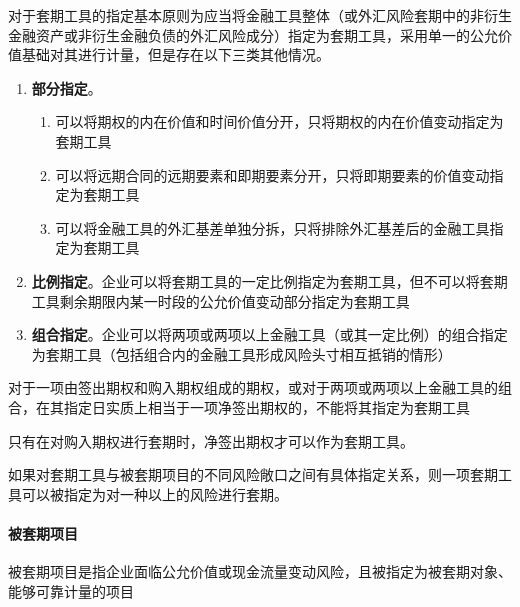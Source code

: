 \documentclass[UTF8,12pt]{ctexart}
\numberwithin{equation}{section} %
\numberwithin{figure}{section}
\numberwithin{table}{section}
\begin{document}
	对于套期工具的指定基本原则为应当将金融工具整体（或外汇风险套期中的非衍生金融资产或非衍生金融负债的外汇风险成分）指定为套期工具，采用单一的公允价值基础对其进行计量，但是存在以下三类其他情况。
	\begin{enumerate}
		\item \textbf{部分指定}。
		\begin{enumerate}
			\item 可以将期权的内在价值和时间价值分开，只将期权的内在价值变动指定为套期工具
			
			\item 可以将远期合同的远期要素和即期要素分开，只将即期要素的价值变动指定为套期工具
			
			\item 可以将金融工具的外汇基差单独分拆，只将排除外汇基差后的金融工具指定为套期工具
			
		\end{enumerate}
		
		\item \textbf{比例指定}。企业可以将套期工具的一定比例指定为套期工具，但不可以将套期工具剩余期限内某一时段的公允价值变动部分指定为套期工具
		
		\item \textbf{组合指定}。企业可以将两项或两项以上金融工具（或其一定比例）的组合指定为套期工具（包括组合内的金融工具形成风险头寸相互抵销的情形）
	\end{enumerate}
	
	对于一项由签出期权和购入期权组成的期权，或对于两项或两项以上金融工具的组合，在其指定日实质上相当于一项净签出期权的，不能将其指定为套期工具
	
	只有在对购入期权进行套期时，净签出期权才可以作为套期工具。
	
	如果对套期工具与被套期项目的不同风险敞口之间有具体指定关系，则一项套期工具可以被指定为对一种以上的风险进行套期。
	
	\paragraph{被套期项目}
	被套期项目是指企业面临公允价值或现金流量变动风险，且被指定为被套期对象、能够可靠计量的项目
	
\end{document}
